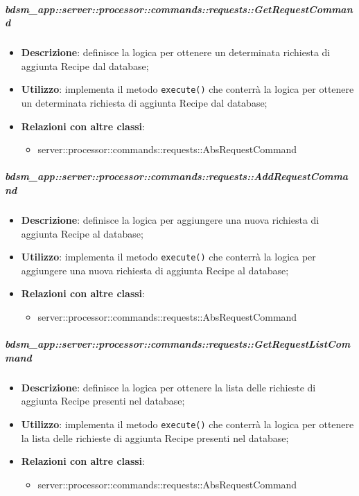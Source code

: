         \subparagraph{bdsm\_app::server::processor::commands::requests::GetRequestCommand} %
        \label{subp:bdsm_app_server_processor_commands_requests_getrequestcommand}
        \begin{itemize}
          \item \textbf{Descrizione}: definisce la logica per ottenere un determinata richiesta di aggiunta Recipe dal database;
          \item \textbf{Utilizzo}: implementa il metodo \texttt{execute()} che conterrà la logica per ottenere un determinata richiesta di aggiunta Recipe dal database;
          \item \textbf{Relazioni con altre classi}:
            \begin{itemize}
              \item server::processor::commands::requests::AbsRequestCommand
            \end{itemize}
        \end{itemize}

        \subparagraph{bdsm\_app::server::processor::commands::requests::AddRequestCommand} %
        \label{subp:bdsm_app_server_processor_commands_requests_addrequestcommand}
        \begin{itemize}
          \item \textbf{Descrizione}: definisce la logica per aggiungere una nuova richiesta di aggiunta Recipe al database;
          \item \textbf{Utilizzo}: implementa il metodo \texttt{execute()} che conterrà la logica per aggiungere una nuova richiesta di aggiunta Recipe al database;
          \item \textbf{Relazioni con altre classi}:
            \begin{itemize}
              \item server::processor::commands::requests::AbsRequestCommand
            \end{itemize}
        \end{itemize}

        \subparagraph{bdsm\_app::server::processor::commands::requests::GetRequestListCommand} %
        \label{subp:bdsm_app_server_processor_commands_requests_getrequestlistcommand}
        \begin{itemize}
          \item \textbf{Descrizione}: definisce la logica per ottenere la lista delle richieste di aggiunta Recipe presenti nel database;
          \item \textbf{Utilizzo}: implementa il metodo \texttt{execute()} che conterrà la logica per ottenere la lista delle richieste di aggiunta Recipe presenti nel database;
          \item \textbf{Relazioni con altre classi}:
            \begin{itemize}
              \item server::processor::commands::requests::AbsRequestCommand
            \end{itemize}
        \end{itemize}

